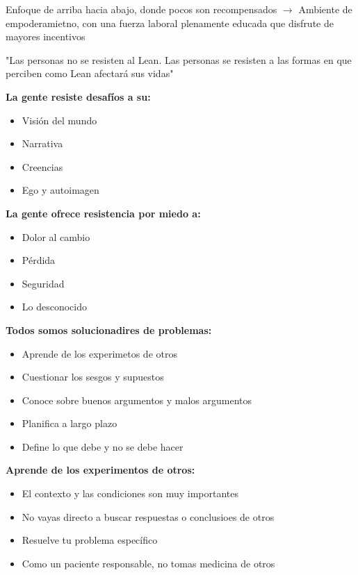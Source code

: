 Enfoque de arriba hacia abajo, donde pocos son recompensados $\rightarrow$ Ambiente de empoderamietno, con una fuerza laboral plenamente educada que disfrute de mayores incentivos

"Las personas no se resisten al Lean. Las personas se resisten a las formas en que perciben como Lean afectará sus vidas"

\begin{table}[h]
\centering
\begin{minipage}{0.45\textwidth}
\raggedright
\textbf{La gente resiste desafíos a su:}
\begin{itemize}
    \item Visión del mundo
    \item Narrativa
    \item Creencias
    \item Ego y autoimagen
\end{itemize}
\end{minipage}
\hfill
\begin{minipage}{0.45\textwidth}
\raggedright
\textbf{La gente ofrece resistencia por miedo a:}
\begin{itemize}
    \item Dolor al cambio
    \item Pérdida
    \item Seguridad
    \item Lo desconocido
\end{itemize}
\end{minipage}
\end{table}



\begin{table}[h]
\centering
\begin{minipage}{0.45\textwidth}
\raggedright
\textbf{Todos somos solucionadires de problemas:}
\begin{itemize}
    \item Aprende de los experimetos de otros
    \item Cuestionar los sesgos y supuestos
    \item Conoce sobre buenos argumentos y malos argumentos
    \item Planifica a largo plazo
    \item Define lo que debe y no se debe hacer
\end{itemize}
\end{minipage}
\hfill
\begin{minipage}{0.45\textwidth}
\raggedright
\textbf{Aprende de los experimentos de otros:}
\begin{itemize}
    \item El contexto y las condiciones son muy importantes
    \item No vayas directo a buscar respuestas o conclusioes de otros
    \item Resuelve tu problema específico
    \item Como un paciente responsable, no tomas medicina de otros
\end{itemize}
\end{minipage}
\end{table}


